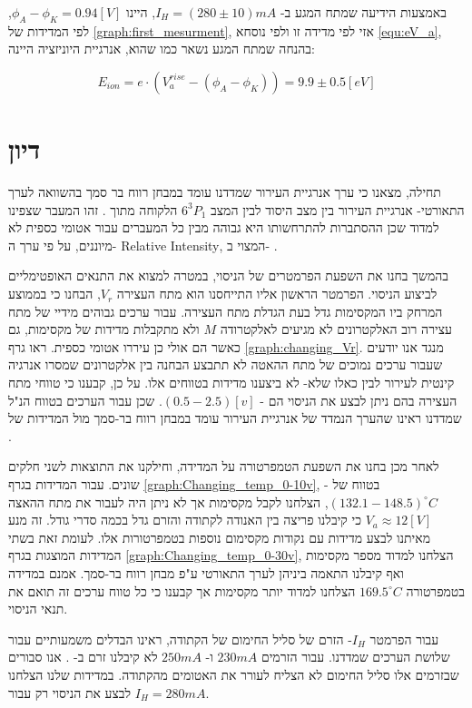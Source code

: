 \documentclass{article}
\newcommand*\circled[1]{\tikz[baseline=(char.base)]{
		            \node[shape=circle,draw,inner sep=1pt] (char) {#1};}}
\begin{document}
באמצעות הידיעה שמתח המגע ב-
$I_H = (280 \pm 10) mA$,
היינו
$\phi_A - \phi_K = 0.94 [V]$,
לפי המדידות של
\ref{graph:first_mesurment},
אזי לפי מדידה זו ולפי נוסחא
\ref{equ:eV_a},
בהנחה שמתח המגע נשאר כמו שהוא, אנרגיית היוניזציה היינה:

$$E_{ion} = e \cdot (V_a^{rise} - (\phi_A - \phi_K)) = 9.9 \pm 0.5 [eV]$$

\section{דיון}

תחילה, מצאנו כי ערך אנרגיית העירור שמדדנו עומד במבחן רווח בר סמך בהשוואה לערך התאורטי-  אנרגיית העירור בין מצב היסוד לבין המצב
$6^3P_1$
הלקוחה מתוך
\cite{NIST_ASD}.
זהו המעבר שצפינו למדוד שכן ההסתברות להתרחשותו היא גבוהה מבין כל המעברים עבור אטומי כספית לא מיוננים, על פי ערך
ה-
\textenglish{Relative Intensity},
המצוי ב-
\cite{NIST_ASD}.

בהמשך בחנו את השפעת הפרמטרים של הניסוי, במטרה למצוא את התנאים האופטימליים לביצוע הניסוי.
הפרמטר הראשון אליו התייחסנו הוא מתח העצירה
$V_r$,
הבחנו כי בממוצע המרחק ביו המקסימות גדל בעת הגדלת מתח העצירה.
עבור ערכים גבוהים מידיי של מתח עצירה רוב האלקטרונים לא מגיעים לאלקטרודה
$M$
ולא מתקבלות מדידות של מקסימות, גם כאשר הם אולי כן עיררו אטומי כספית. ראו גרף
\ref{graph:changing_Vr}.
מנגד אנו יודעים שעבור ערכים נמוכים של מתח ההאטה לא תתבצע הבחנה בין אלקטרונים שמסרו אנרגיה קינטית לעירור לבין כאלו שלא- לא ביצענו מדידות בטווחים אלו.
על כן, קבענו כי טווחי מתח העצירה בהם ניתן לבצע את הניסוי הם -
$(0.5 - 2.5)[v]$.
שכן עבור הערכים בטווח הנ"ל שמדדנו ראינו שהערך הנמדד של אנרגיית העירור עומד במבחן רווח בר-סמך מול המדידות של
\cite{NIST_ASD}.

לאחר מכן בחנו את השפעת הטמפרטורה על המדידה, וחילקנו את התוצאות לשני חלקים שונים.
עבור המדידות בגרף
\ref{graph:Changing_temp_0-10v},
- בטווח של
$(132.1 - 148.5)^{\circ}C$,
הצלחנו לקבל מקסימות אך לא ניתן היה לעבור את מתח ההאצה
$V_a \approx 12 [V]$
כי קיבלנו פריצה בין האנודה לקתודה והזרם גדל בכמה סדרי גודל. 
זה מנע מאיתנו לבצע מדידות עם נקודות מקסימום נוספות בטמפרטורות אלו. לעומת זאת בשתי המדידות המוצגות בגרף
\ref{graph:Changing_temp_0-30v},
הצלחנו למדוד מספר מקסימות ואף קיבלנו התאמה ביניהן לערך התאורטי ע"פ מבחן רווח בר-סמך. אמנם במדידה בטמפרטורה 
$169.5 ^{\circ}C$
הצלחנו למדוד יותר מקסימות אך קבענו כי כל טווח ערכים זה תואם את תנאי הניסוי.

עבור הפרמטר 
$I_H$-
הזרם של סליל החימום של הקתודה, ראינו הבדלים משמעותיים עבור שלושת הערכים שמדדנו. עבור הזרמים
$230 mA$
ו-
$250 mA$
לא קיבלנו זרם ב-
\circled{pA}.
אנו סבורים שבזרמים אלו סליל החימום לא הצליח לעורר את האטומים מהקתודה. במדידות שלנו הצלחנו לבצע את הניסוי רק עבור
$I_H = 280 mA$.
\end{document}
